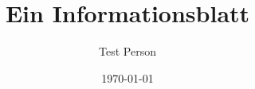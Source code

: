 \documentclass[a4paper]{scrartcl}
\author{Test Person}
\date{\today}
\title{Ein Informationsblatt}
\begin{document}
\section*{\Titel}
\blindtext
\end{document}
